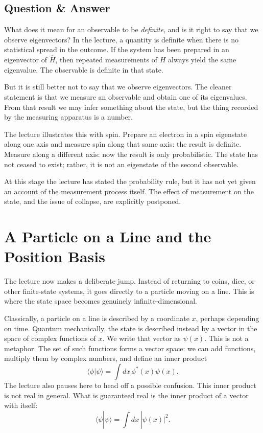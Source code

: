 \subsection{Question \& Answer}

What does it mean for an observable to be \emph{definite}, and is it right to say that we observe eigenvectors? In the lecture, a quantity is definite when there is no statistical spread in the outcome. If the system has been prepared in an eigenvector of \(\hat H\), then repeated measurements of \(H\) always yield the same eigenvalue. The observable is definite in that state.

But it is still better not to say that we observe eigenvectors. The cleaner statement is that we measure an observable and obtain one of its eigenvalues. From that result we may infer something about the state, but the thing recorded by the measuring apparatus is a number.

The lecture illustrates this with spin. Prepare an electron in a spin eigenstate along one axis and measure spin along that same axis: the result is definite. Measure along a different axis: now the result is only probabilistic. The state has not ceased to exist; rather, it is not an eigenstate of the second observable.

\begin{remark}
At this stage the lecture has stated the probability rule, but it has not yet given an account of the measurement process itself. The effect of measurement on the state, and the issue of collapse, are explicitly postponed.
\end{remark}

\section{A Particle on a Line and the Position Basis}

The lecture now makes a deliberate jump. Instead of returning to coins, dice, or other finite-state systems, it goes directly to a particle moving on a line. This is where the state space becomes genuinely infinite-dimensional.

Classically, a particle on a line is described by a coordinate \(x\), perhaps depending on time. Quantum mechanically, the state is described instead by a vector in the space of complex functions of \(x\). We write that vector as \(\psi(x)\). This is not a metaphor. The set of such functions forms a vector space: we can add functions, multiply them by complex numbers, and define an inner product
\begin{equation}
\langle \phi|\psi\rangle=\int dx\, \phi^*(x)\psi(x).
\end{equation}
The lecture also pauses here to head off a possible confusion. This inner product is not real in general. What is guaranteed real is the inner product of a vector with itself:
\begin{equation}
\langle \psi|\psi\rangle=\int dx\, |\psi(x)|^2.
\end{equation}

